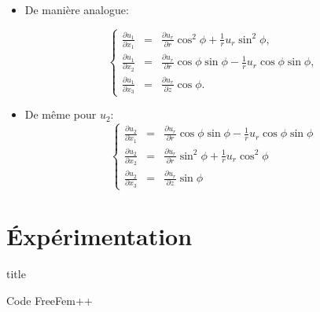 \documentclass[french]{beamer}
\begin{document}
\begin{frame} 

\begin{itemize}
  \item De manière analogue:


	
      \begin{equation*}
	\left \{
	  \begin{array}{ccc}
\frac{\partial u_1}{\partial x_1} &=& \frac{\partial u_r}{\partial r}\cos^2\phi + \frac{1}{r} u_r\sin^2\phi,\nonumber \\
\frac{\partial u_1}{\partial x_2} &=& \frac{\partial u_r}{\partial r}\cos\phi\sin\phi - \frac{1}{r}u_r \cos\phi\sin\phi, \nonumber \\
\frac{\partial u_1}{\partial x_3} &=&\frac{\partial u_r}{\partial z}\cos\phi. \nonumber
	  \end{array}
	  \right.
	\end{equation*}
	
\pause
 \item De même pour $u_2$:
      \begin{equation*}
	\left \{
	  \begin{array}{ccc}

\frac{\partial u_2}{\partial x_1} &=& \frac{\partial u_r}{\partial r}\cos\phi\sin\phi - \frac{1}{r}u_r \cos\phi\sin\phi \\
\frac{\partial u_2}{\partial x_2} &=& \frac{\partial u_r}{\partial r}\sin^2\phi + \frac{1}{r} u_r\cos^2\phi \\
\frac{\partial u_2}{\partial x_3} &=& \frac{\partial u_r}{\partial z}\sin\phi
	  \end{array}
	  \right.
	\end{equation*}

	
  \end{itemize}
\end{frame}	


\begin{frame}
  \begin{itemize}
  
  

  \end{itemize}
\end{frame}

  \section{Éxpérimentation}
  \begin{frame}
    \vfill
    \centering
    \begin{beamercolorbox}[sep=8pt,center,shadow=true,rounded=true]{title}
      \insertsectionhead
    \end{beamercolorbox}
    \vfill
  \end{frame}

  \begin{frame}{Code FreeFem++}
  \end{frame}

  
\end{document}
